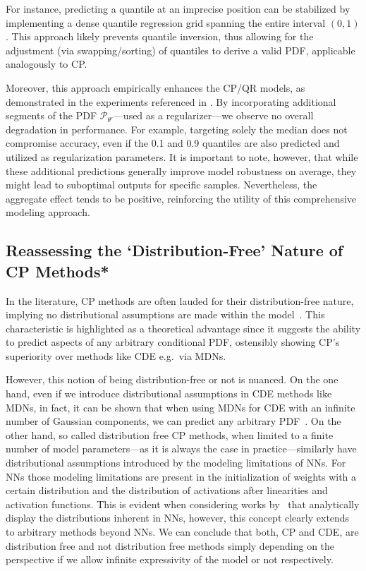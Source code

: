For instance, predicting a quantile at an imprecise position can be stabilized by implementing a dense quantile regression grid spanning the entire interval $(0,1)$. This approach likely prevents quantile inversion, thus allowing for the adjustment (via swapping/sorting) of quantiles to derive a valid PDF, applicable analogously to CP.\@

Moreover, this approach empirically enhances the CP/QR models, as demonstrated in the experiments referenced in . By incorporating additional segments of the PDF $\mathcal{P}_{\theta'}$—used as a regularizer—we observe no overall degradation in performance. For example, targeting solely the median does not compromise accuracy, even if the 0.1 and 0.9 quantiles are also predicted and utilized as regularization parameters. It is important to note, however, that while these additional predictions generally improve model robustness on average, they might lead to suboptimal outputs for specific samples. Nevertheless, the aggregate effect tends to be positive, reinforcing the utility of this comprehensive modeling approach.

\subsection{Reassessing the `Distribution-Free' Nature of CP Methods*}

In the literature, CP methods are often lauded for their distribution-free nature, implying no distributional assumptions are made within the model~\cite{angelopoulos2021gentle}. This characteristic is highlighted as a theoretical advantage since it suggests the ability to predict aspects of any arbitrary conditional PDF, ostensibly showing CP's superiority over methods like CDE e.g.\ via MDNs.

However, this notion of being distribution-free or not is nuanced. On the one hand, even if we introduce distributional assumptions in CDE methods like MDNs, in fact, it can be shown that when using MDNs for CDE with an infinite number of Gaussian components, we can predict any arbitrary PDF~\cite{bishop1994mixture}. On the other hand, so called distribution free CP methods, when limited to a finite number of model parameters—as it is always the case in practice—similarly have distributional assumptions introduced by the modeling limitations of NNs. For NNs those modeling limitations are present in the initialization of weights with a certain distribution and the distribution of activations after linearities and activation functions. This is evident when considering works by~\cite{klambauer2017self, ioffe2015batch} that analytically display the distributions inherent in NNs, however, this concept clearly extends to arbitrary methods beyond NNs. We can conclude that both, CP and CDE, are distribution free and not distribution free methods simply depending on the perspective if we allow infinite expressivity of the model or not respectively.


